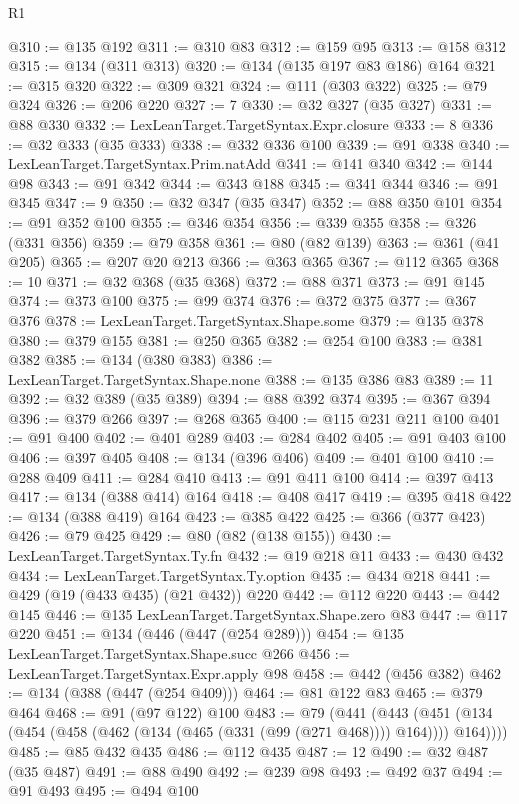 \begin{lexlean}{R1}
\begin{coremodule}
{{{{{{{{{{{{{{{{{{{{{{{{{{{{{{{{{{{{{{{{{{{{{{{{{{{{{{{{{@310 := @135 @192
@311 := @310 @83
@312 := @159 @95
@313 := @158 @312
@315 := @134 (@311 @313)
@320 := @134 (@135 @197 @83 @186) @164
@321 := @315 @320
@322 := @309 @321
@324 := @111 (@303 @322)
@325 := @79 @324
@326 := @206 @220
@327 := 7
@330 := @32 @327 (@35 @327)
@331 := @88 @330
@332 := LexLeanTarget.TargetSyntax.Expr.closure
@333 := 8
@336 := @32 @333 (@35 @333)
@338 := @332 @336 @100
@339 := @91 @338
@340 := LexLeanTarget.TargetSyntax.Prim.natAdd
@341 := @141 @340
@342 := @144 @98
@343 := @91 @342
@344 := @343 @188
@345 := @341 @344
@346 := @91 @345
@347 := 9
@350 := @32 @347 (@35 @347)
@352 := @88 @350 @101
@354 := @91 @352 @100
@355 := @346 @354
@356 := @339 @355
@358 := @326 (@331 @356)
@359 := @79 @358
@361 := @80 (@82 @139)
@363 := @361 (@41 @205)
@365 := @207 @20 @213
@366 := @363 @365
@367 := @112 @365
@368 := 10
@371 := @32 @368 (@35 @368)
@372 := @88 @371
@373 := @91 @145
@374 := @373 @100
@375 := @99 @374
@376 := @372 @375
@377 := @367 @376
@378 := LexLeanTarget.TargetSyntax.Shape.some
@379 := @135 @378
@380 := @379 @155
@381 := @250 @365
@382 := @254 @100
@383 := @381 @382
@385 := @134 (@380 @383)
@386 := LexLeanTarget.TargetSyntax.Shape.none
@388 := @135 @386 @83
@389 := 11
@392 := @32 @389 (@35 @389)
@394 := @88 @392 @374
@395 := @367 @394
@396 := @379 @266
@397 := @268 @365
@400 := @115 @231 @211 @100
@401 := @91 @400
@402 := @401 @289
@403 := @284 @402
@405 := @91 @403 @100
@406 := @397 @405
@408 := @134 (@396 @406)
@409 := @401 @100
@410 := @288 @409
@411 := @284 @410
@413 := @91 @411 @100
@414 := @397 @413
@417 := @134 (@388 @414) @164
@418 := @408 @417
@419 := @395 @418
@422 := @134 (@388 @419) @164
@423 := @385 @422
@425 := @366 (@377 @423)
@426 := @79 @425
@429 := @80 (@82 (@138 @155))
@430 := LexLeanTarget.TargetSyntax.Ty.fn
@432 := @19 @218 @11
@433 := @430 @432
@434 := LexLeanTarget.TargetSyntax.Ty.option
@435 := @434 @218
@441 := @429 (@19 (@433 @435) (@21 @432)) @220
@442 := @112 @220
@443 := @442 @145
@446 := @135 LexLeanTarget.TargetSyntax.Shape.zero @83
@447 := @117 @220
@451 := @134 (@446 (@447 (@254 @289)))
@454 := @135 LexLeanTarget.TargetSyntax.Shape.succ @266
@456 := LexLeanTarget.TargetSyntax.Expr.apply @98
@458 := @442 (@456 @382)
@462 := @134 (@388 (@447 (@254 @409)))
@464 := @81 @122 @83
@465 := @379 @464
@468 := @91 (@97 @122) @100
@483 := @79
    (@441
      (@443 (@451 (@134 (@454 (@458 (@462 (@134 (@465 (@331 (@99 (@271 @468)))) @164)))) @164))))
@485 := @85 @432 @435
@486 := @112 @435
@487 := 12
@490 := @32 @487 (@35 @487)
@491 := @88 @490
@492 := @239 @98
@493 := @492 @37
@494 := @91 @493
@495 := @494 @100
}}}}}}}}}}}}}}}}}}}}}}}}}}}}}}}}}}}}}}}}}}}}}}}}}}}}}}}}}
\end{coremodule}
\end{lexlean}
